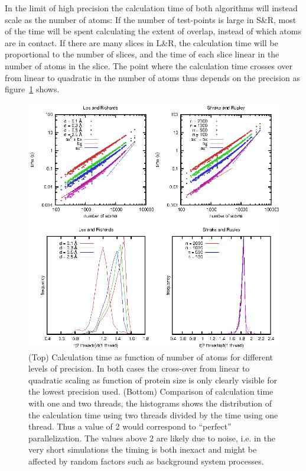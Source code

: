 \documentclass[a4paper,11pt]{article}
\begin{document}
In the limit of high precision the calculation time of both algorithms
will instead scale as the number of atoms: If the number of
test-points is large in S\&R, most of the time will be spent
calculating the extent of overlap, instead of which atoms are in
contact. If there are many slices in L\&R, the calculation time will
be proportional to the number of slices, and the time of each slice
linear in the number of atoms in the slice.  The point where the
calculation time crosses over from linear to quadratic in the number
of atoms thus depends on the precision as figure~\ref{fig:time} shows.

\begin{figure}
  \begin{center}
  \includegraphics{../analysis/plots/time}
  \caption{(Top) Calculation time as function of number of atoms for
    different levels of precision. In both cases the cross-over from
    linear to quadratic scaling as function of protein size is only
    clearly visible for the lowest precision used.  (Bottom)
    Comparison of calculation time with one and two threads, the
    histograms shows the distribution of the calculation time using
    two threads divided by the time using one thread. Thus a value of
    2 would correspond to ``perfect'' parallelization. The values
    above 2 are likely due to noise, i.e. in the very short
    simulations the timing is both inexact and might be affected by
    random factors such as background system processes.
    \label{fig:time}}
  \end{center}
\end{figure}
\end{document}
